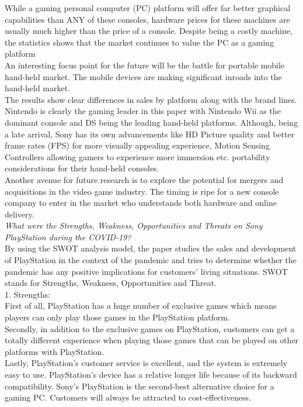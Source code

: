 \documentclass[conference]{IEEEtran}
\begin{document}
While a gaming personal computer (PC) platform will offer far better graphical capabilities than ANY of these consoles, hardware prices for these machines are usually much higher than the price of a console. Despite being a costly machine, the statistics shows that the market continues to value the PC as a gaming platform\\
An interesting focus point for the future will be the battle for portable mobile hand-held market. The mobile devices are making significant inroads into the hand-held market.\\
The results show clear differences in sales by platform along with the brand lines. Nintendo is clearly the gaming leader in this paper with Nintendo Wii as the dominant console and DS being the leading hand-held platforms. Although, being a late arrival, Sony has its own advancements like HD Picture quality and better frame rates (FPS) for more visually appealing experience, Motion Sensing Controllers allowing gamers to experience more immersion etc. portability considerations for their hand-held consoles. \\
Another avenue for future research is to explore the potential for mergers and acquisitions in the video game industry. The timing is ripe for a new console company to enter in the market who understands both hardware and online delivery.\\
\hfill \break
\textit{What were the Strengths, Weakness, Opportunities and Threats on Sony PlayStation during the COVID-19?}\\
By using the SWOT analysis model, the paper studies the sales and development of PlayStation in the context of the pandemic and tries to determine whether the pandemic has any positive implications for customers' living situations. SWOT stands for Strengths, Weakness, Opportunities and Threat.\\
1. Strengths:\\
First of all, PlayStation has a huge number of exclusive games which means players can only play those games in the PlayStation platform.\\
Secondly, in addition to the exclusive games on PlayStation, customers can get a totally different experience when playing those games that can be played on other platforms with PlayStation.\\
Lastly, PlayStation's customer service is excellent, and the system is extremely easy to use. PlayStation's device has a relative longer life because of its backward compatibility. Sony’s PlayStation is the second-best alternative choice for a gaming PC. Customers will always be attracted to cost-effectiveness. \\
\end{document}
